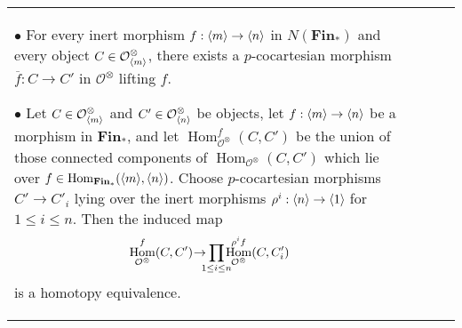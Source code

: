 \documentclass{article}
\DeclareMathOperator{\Hom}{Hom}
\begin{document}
\begin{landscape}
\begin{centre}
\begin{longtable}{ |p{3.2cm}||p{7cm}|p{7cm}|p{8cm}|  }
\(\bullet\) For every inert morphism \(f : \langle m\rangle\to \langle n\rangle\) in \(N(\textbf{Fin}_*)\) and every object \(C\in \mathcal{O}^\otimes_{\langle m\rangle}\), there exists a \(p\)-cocartesian morphism \(\overline f : C \to C'\) in \(\mathcal{O}^\otimes\) lifting \(f\).

\(\bullet\) Let \(C \in \mathcal{O}^\otimes_{\langle m\rangle}\) and \(C'\in \mathcal{O}^\otimes_{\langle n\rangle}\) be objects, let \(f : \langle m\rangle\to \langle n\rangle\) be a morphism in \(\textbf{Fin}_*\), and let \(\Hom^f_{\mathcal{O}^\otimes}(C,C')\) be the union of those connected components of \(\Hom_{\mathcal{O}^\otimes}(C,C')\) which lie over \(f\in \Hom_{\textbf{Fin}_*}(\ang{m}, \ang{n})\). Choose \(p\)-cocartesian morphisms \(C' \to C'_i\) lying over the inert morphisms \(\rho^i : \langle n\rangle\to \langle1\rangle\) for \(1 \leq i \leq n\). Then the induced map
\[\Hom^f_{\mathcal{O}^\otimes}(C,C')\hspace{-0.5ex}\to\hspace{-1.5ex}\prod_{1\leq i\leq n}\hspace{-1.5ex}\Hom^{\rho^i f}_{\mathcal{O}^\otimes}(C,C_i')\]
is a homotopy equivalence.


\end{longtable}
\end{centre}
\end{landscape}
\end{document}
